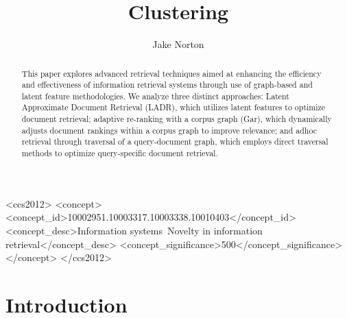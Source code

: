 \documentclass[sigconf,authorversion,nonacm]{acmart}
\begin{document}
 \title{Clustering} \author{Jake Norton}  


\begin{abstract} This paper explores advanced retrieval techniques aimed at enhancing the efficiency
    and effectiveness of information retrieval systems through use of graph-based and
    latent feature methodologies. We analyze three distinct approaches: Latent Approximate Document
    Retrieval (LADR), which utilizes latent features to optimize document retrieval; adaptive
    re-ranking with a corpus graph (Gar), which dynamically adjusts document rankings within a
    corpus graph to improve relevance; and adhoc retrieval through traversal of a query-document
    graph, which employs direct traversal methods to optimize query-specific document retrieval.
\end{abstract}


\begin{CCSXML} <ccs2012> <concept> <concept_id>10002951.10003317.10003338.10010403</concept_id>
<concept_desc>Information systems~Novelty in information retrieval</concept_desc>
<concept_significance>500</concept_significance> </concept> </ccs2012> \end{CCSXML}



\maketitle
\section{Introduction} 
\end{document}

